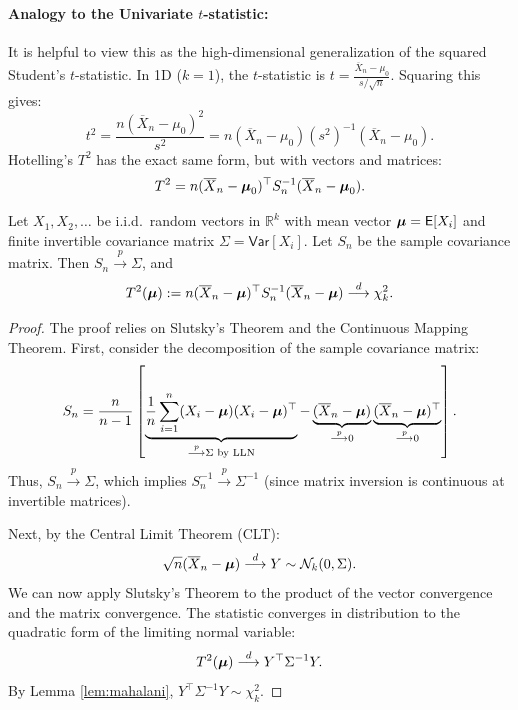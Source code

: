 \paragraph{Analogy to the Univariate $t$-statistic:}
It is helpful to view this as the high-dimensional generalization of the squared Student's $t$-statistic.
In 1D ($k=1$), the $t$-statistic is $t = \frac{\overline{X}_n - \mu_0}{s/\sqrt{n}}$. Squaring this gives:
\[
    t^2 = \frac{n(\overline{X}_n - \mu_0)^2}{s^2} = n (\overline{X}_n - \mu_0) (s^2)^{-1} (\overline{X}_n - \mu_0).
\]
Hotelling's $T^2$ has the exact same form, but with vectors and matrices:
\[
    T^2 = n (\overline{X}_n - \boldsymbol{\mu}_0)^\top S_n^{-1} (\overline{X}_n - \boldsymbol{\mu}_0).
\]

\begin{theo}
\label{theo:hotelling}
Let $X_1, X_2, \dots$ be i.i.d.\ random vectors in $\mathbb{R}^{k}$ with mean vector $\boldsymbol{\mu} = \mathsf{E}[X_{i}]$ and finite invertible covariance matrix $\Sigma = \mathsf{Var}[X_{i}]$. Let $S_n$ be the sample covariance matrix.
Then $S_{n} \overset{p}{\longrightarrow} \Sigma$, and
\[
    T^2(\boldsymbol{\mu}) := n (\overline{X}_{n}-\boldsymbol{\mu})^{\top}S_{n}^{-1}(\overline{X}_{n} -\boldsymbol{\mu}) \overset{d}{\longrightarrow}\chi^2_{k}.
\]
\end{theo}

\begin{proof}
    The proof relies on Slutsky's Theorem and the Continuous Mapping Theorem.
    First, consider the decomposition of the sample covariance matrix:
    \[
        S_{n}= \frac{n}{n-1} \left[ \underbrace{\frac{1}{n}\sum_{i=1}^{n} (X_{i}-\boldsymbol{\mu})(X_{i}-\boldsymbol{\mu})^{\top}}_{ \overset{p}{\longrightarrow}\Sigma \text{ by LLN}} - \underbrace{(\overline{X}_{n}-\boldsymbol{\mu})}_{ \overset{p}{\longrightarrow}0}\underbrace{(\overline{X}_{n}-\boldsymbol{\mu})^{\top}}_{ \overset{p}{\longrightarrow}0} \right].
    \]
    Thus, $S_{n} \overset{p}{\longrightarrow} \Sigma$, which implies $S_n^{-1} \overset{p}{\longrightarrow} \Sigma^{-1}$ (since matrix inversion is continuous at invertible matrices).

    Next, by the Central Limit Theorem (CLT):
    \[
        \sqrt{n} (\overline{X}_{n}-\boldsymbol{\mu}) \overset{d}{\longrightarrow} Y \sim \mathcal{N}_{k}(0,\Sigma).
    \]
    We can now apply Slutsky's Theorem to the product of the vector convergence and the matrix convergence. The statistic converges in distribution to the quadratic form of the limiting normal variable:
    \[
        T^2(\boldsymbol{\mu}) \overset{d}{\longrightarrow} Y^{\top}\Sigma^{-1}Y.
    \]
    By Lemma \ref{lem:mahalani}, $Y^{\top}\Sigma^{-1}Y \sim \chi^2_{k}$.
\end{proof}


